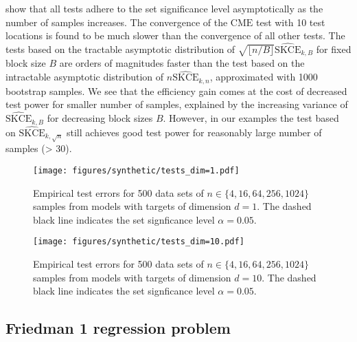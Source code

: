 \documentclass{article}
\begin{document}
 show that all tests adhere to the set
significance level asymptotically as the number of samples increases. The convergence of
the $\mathrm{CME}$ test with 10 test locations is found to be much slower than the convergence
of all other tests.
The tests based on the tractable asymptotic distribution of
$\sqrt{\lfloor n / B \rfloor} \widehat{\mathrm{SKCE}}_{k,B}$ for
fixed block size $B$ are orders of magnitudes faster than the test based on the intractable
asymptotic distribution of $n \widehat{\mathrm{SKCE}}_{k,n}$, approximated with 1000 bootstrap
samples. We see that the efficiency gain comes at the cost of decreased test power for smaller
number of samples, explained by the increasing variance of $\widehat{\mathrm{SKCE}}_{k,B}$ for
decreasing block sizes $B$.
However, in our examples the test based on $\widehat{\mathrm{SKCE}}_{k,\sqrt{n}}$
still achieves good test power for reasonably large number of samples (> 30).

\begin{figure}[hpt]
    \begin{center}
        \texttt{[image: figures/synthetic/tests\_dim=1.pdf]}
        \caption{Empirical test errors for 500 data sets of $n \in \{4, 16, 64, 256, 1024\}$
        samples from models with targets of dimension $d = 1$. The dashed black line
        indicates the set signficance level $\alpha = 0.05$.}
        \label{fig:synthetic_tests_1}
    \end{center}
\end{figure}

\begin{figure}[hpt]
    \begin{center}
        \texttt{[image: figures/synthetic/tests\_dim=10.pdf]}
        \caption{Empirical test errors for 500 data sets of $n \in \{4, 16, 64, 256, 1024\}$
        samples from models with targets of dimension $d = 10$. The dashed black line
        indicates the set signficance level $\alpha = 0.05$.}
        \label{fig:synthetic_tests_10}
    \end{center}
\end{figure}

\clearpage

\subsection{Friedman 1 regression problem}
\end{document}
